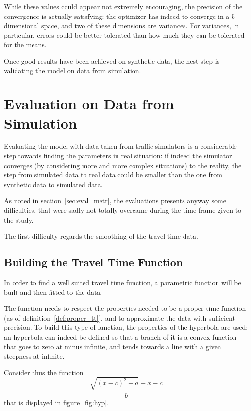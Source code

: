 While these values could appear not extremely encouraging,
the precision of the convergence is actually satisfying:
the optimizer has indeed to converge in a 5-dimensional space,
and two of these dimensions are variances.
For variances, in particular, errors could be better tolerated than how much they can be tolerated for the means.

Once good results have been achieved on synthetic data,
the nest step is validating the model on data from simulation.

\section{Evaluation on Data from Simulation}
\label{sec:res_eval_metr}

Evaluating the model with data taken from traffic simulators is a considerable step towards finding the parameters in real situation:
if indeed the simulator converges (by considering more and more complex situations) to the reality,
the step from simulated data to real data could be smaller than the one from synthetic data to simulated data.

As noted in section~\ref{sec:eval_metr},
the evaluations presents anyway some difficulties,
that were sadly not totally overcame during the time frame given to the study.

The first difficulty regards the smoothing of the travel time data.

\subsection{Building the Travel Time Function}

In order to find a well suited travel time function,
a parametric function will be built and then fitted to the data.

The function needs to respect the properties needed to be a proper time function (as of definition~\ref{def:proper_tt}),
and to approximate the data with sufficient precision.
To build this type of function,
the properties of the hyperbola are used:
an hyperbola can indeed be defined so that a branch of it is a convex function that goes to zero at minus infinite,
and tends towards a line with a given steepness at infinite.

Consider thus the function
\begin{equation}
  \label{eq:hyperbola}
  \frac{\sqrt{(x - c)^2 + a} + x - c}{b}
\end{equation}
that is displayed in figure~\ref{fig:hyp}.

